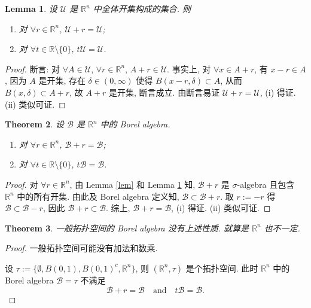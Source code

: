 \documentclass[a4paper,11pt]{article}
\newtheorem{theorem}{Theorem}[section]
\newtheorem{lemma}[theorem]{Lemma}
\theoremstyle{definition}
\begin{document}
\begin{lemma} \label{lem2}
    设 $ \mathcal{U} $ 是 $ \mathbb{R}^n $ 中全体开集构成的集合. 则
    \begin{enumerate}[{\rm (i)}]
        \item 对 $ \forall r \in \mathbb{R}^n $, $ \mathcal{U} + r = \mathcal{U} $;
        \item 对 $ \forall t \in \mathbb{R} \setminus \{0\} $, $ t \mathcal{U} = \mathcal{U} $.
    \end{enumerate}
\end{lemma}

\begin{proof}
    断言: 对 $ \forall A \in \mathcal{U} $, $ \forall r \in \mathbb{R}^n $, $ A + r \in \mathcal{U} $.
    事实上, 对 $ \forall x \in A + r $, 有 $ x - r \in A $, 因为 $ A $ 是开集, 存在 $ \delta \in (0, \infty) $
    使得 $ B(x - r, \delta) \subset A $, 从而 $ B(x, \delta) \subset A + r $, 故 $ A + r $ 是开集, 断言成立.
    由断言易证 $ \mathcal{U} + r = \mathcal{U} $, (i) 得证. 
    (ii) 类似可证.
\end{proof}

\begin{theorem} \label{thm1}
    设 $ \mathscr{B} $ 是 $ \mathbb{R}^n $ 中的 Borel algebra.
    \begin{enumerate}[{\rm (i)}]
        \item 对 $ \forall r \in \mathbb{R}^n $, $ \mathscr{B} + r = \mathscr{B} $;
        \item 对 $ \forall t \in \mathbb{R} \setminus \{0\} $, $ t \mathscr{B} = \mathscr{B} $.
    \end{enumerate}
\end{theorem}

\begin{proof}
    对 $ \forall r \in \mathbb{R}^n $, 由 Lemma \ref{lem} 和 Lemma \ref{lem2}  知, 
    $ \mathscr{B} + r $ 是 $ \sigma $-algebra 且包含 $ \mathbb{R}^n $ 中的所有开集.
    由此及 Borel algebra 定义知, $ \mathscr{B} \subset \mathscr{B} + r $.
    取 $ r := -r $ 得 $ \mathscr{B} \subset \mathscr{B} - r $,
    因此 $ \mathscr{B} + r \subset \mathscr{B} $.
    综上, $ \mathscr{B} + r = \mathscr{B} $, (i) 得证. 
    (ii) 类似可证.
\end{proof}

\begin{theorem} \label{thm2}
    一般拓扑空间的 Borel algebra 没有上述性质. 就算是 $ \mathbb{R}^n $ 也不一定.
\end{theorem}

\begin{proof}
    一般拓扑空间可能没有加法和数乘.
    
    设 $ \tau := \{ \emptyset, B(0,1), B(0,1)^c, \mathbb{R}^n \} $, 则 $ (\mathbb{R}^n, \tau) $ 是个拓扑空间.
    此时 $ \mathbb{R}^n $ 中的 Borel algebra $ \mathscr{B} = \tau $ 不满足 
    $$ 
        \mathscr{B} + r = \mathscr{B} 
            \quad \text{and} \quad 
        t \mathscr{B} = \mathscr{B}.
    $$
\end{proof}
\end{document}
